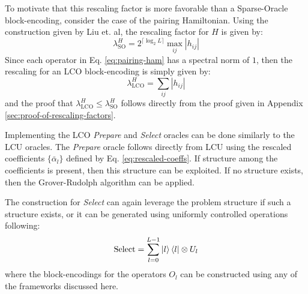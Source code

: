 To motivate that this rescaling factor is more favorable than a Sparse-Oracle block-encoding, consider the case of the pairing Hamiltonian.
Using the construction given by Liu et. al, the rescaling factor for $H$ is given by:
\begin{equation}
    \lambda_\text{SO}^H = 2^{\lceil \log_2 L \rceil} \max_{ij} |h_{ij}|
\end{equation}
Since each operator in Eq. \ref{eq:pairing-ham} has a spectral norm of $1$, then the rescaling for an LCO block-encoding is simply given by:
\begin{equation}
    \lambda_\text{LCO}^H = \sum_{ij} |h_{ij}|
\end{equation}
and the proof that $\lambda_\text{LCO}^H \leq \lambda_\text{SO}^H$ follows directly from the proof given in Appendix \ref{sec:proof-of-rescaling-factors}.

Implementing the LCO \textit{Prepare} and \textit{Select} oracles can be done similarly to the LCU oracles.
The \textit{Prepare} oracle follows directly from LCU using the rescaled coefficients $\{\bar{\alpha}_l\}$ defined by Eq. \ref{eq:rescaled-coeffs}. 
If structure among the coefficients is present, then this structure can be exploited. 
If no structure exists, then the Grover-Rudolph algorithm can be applied.

The construction for \textit{Select} can again leverage the problem structure if such a structure exists, or it can be generated using uniformly controlled operations following:
\begin{equation}
    \label{eq:select-lco}
    \text{Select} = \sum_{l=0}^{L-1} \ket{l}\bra{l} \otimes U_l
\end{equation}
where the block-encodings for the operators $O_l$ can be constructed using any of the frameworks discussed here.